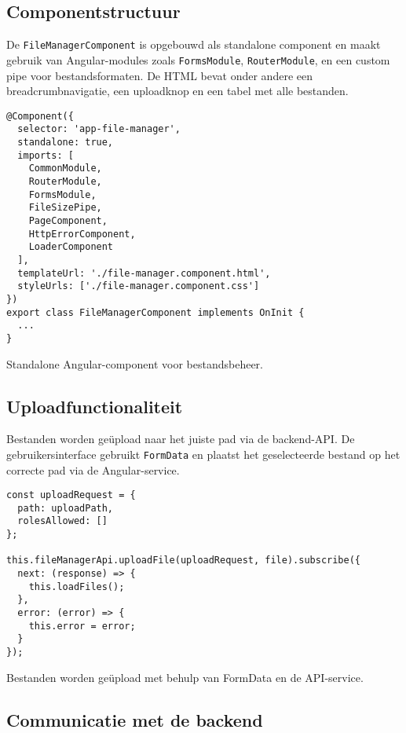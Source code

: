 \subsection{Componentstructuur}

De \texttt{FileManagerComponent} is opgebouwd als standalone component en maakt gebruik van Angular-modules zoals \texttt{FormsModule}, \texttt{RouterModule}, en een custom pipe voor bestandsformaten. De HTML bevat onder andere een breadcrumbnavigatie, een uploadknop en een tabel met alle bestanden.

\begin{listing}[H]
\begin{verbatim}
@Component({
  selector: 'app-file-manager',
  standalone: true,
  imports: [
    CommonModule,
    RouterModule,
    FormsModule,
    FileSizePipe,
    PageComponent,
    HttpErrorComponent,
    LoaderComponent
  ],
  templateUrl: './file-manager.component.html',
  styleUrls: ['./file-manager.component.css']
})
export class FileManagerComponent implements OnInit {
  ...
}
\end{verbatim}
\caption[Structuur van de FileManagerComponent]{Standalone Angular-component voor bestandsbeheer.}
\end{listing}

\subsection{Uploadfunctionaliteit}

Bestanden worden geüpload naar het juiste pad via de backend-API. De gebruikersinterface gebruikt \texttt{FormData} en plaatst het geselecteerde bestand op het correcte pad via de Angular-service.

\begin{listing}[H]
\begin{verbatim}
const uploadRequest = {
  path: uploadPath,
  rolesAllowed: []
};

this.fileManagerApi.uploadFile(uploadRequest, file).subscribe({
  next: (response) => {
    this.loadFiles();
  },
  error: (error) => {
    this.error = error;
  }
});
\end{verbatim}
\caption[Uploadfunctionaliteit in de component]{Bestanden worden geüpload met behulp van FormData en de API-service.}
\end{listing}

\subsection{Communicatie met de backend}

